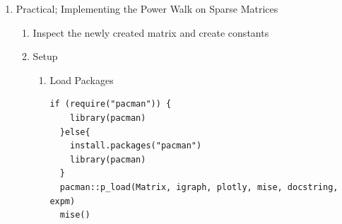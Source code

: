 \documentclass[11pt]{article}
\begin{document}
\begin{enumerate}
\begin{enumerate}
\[\begin{aligned}
\begin{array}{c}
       \overrightarrow{\delta^{{\footnotesize \tmmathbf{T}}}} \vec{p}_i\\
       \overrightarrow{\delta^{{\footnotesize \tmmathbf{T}}}} \vec{p}_i\\
       \vdots
     \end{array} \right) \nonumber\\
     & = \overrightarrow{\delta^{{\footnotesize \tmmathbf{T}}}}
     \overrightarrow{p_i} \left( \begin{array}{c}
       1\\
       1\\
       1\\
       \vdots
     \end{array} \right) \nonumber\\
     & = (\overrightarrow{\delta^{{\footnotesize \tmmathbf{T}}}}
     \overrightarrow{p_i})  \vec{1}\\
     & = \mathtt{repeat} (\overrightarrow{\delta} \overrightarrow{p_i}
     \mathtt{, n}) \label{eq:sparse-power-walk}
   \end{aligned} \]
Observe also that If we let \(\vec{\delta}\) and \(p_i\) be 1 dimensional
vectors, this can also be expressed as a dot product:

\begin{center}
\begin{tabular}{ll}
Matrices & Vectors\\
\(\vec{\delta^{\mathrm{T}}} \vec{p_{i}}\) & \(\vec{\delta} \vec{p_{i}}\)\\
\end{tabular}
\end{center}
\end{enumerate}

\item Practical; Implementing the Power Walk on Sparse Matrices
\label{sec:org5eb108d}
\begin{enumerate}
\item Inspect the newly created matrix and create constants
\label{sec:org3731db8}
\item Setup
\label{sec:orgc09e4e4}
\begin{enumerate}
\item Load Packages
\label{sec:orgaf6ef18}
\lstset{language=r,label= ,caption= ,captionpos=b,numbers=none}
\begin{lstlisting}
if (require("pacman")) {
    library(pacman)
  }else{
    install.packages("pacman")
    library(pacman)
  }
  pacman::p_load(Matrix, igraph, plotly, mise, docstring, expm)
  mise()
\end{lstlisting}


\end{enumerate}
\end{enumerate}
\end{enumerate}
\end{document}
